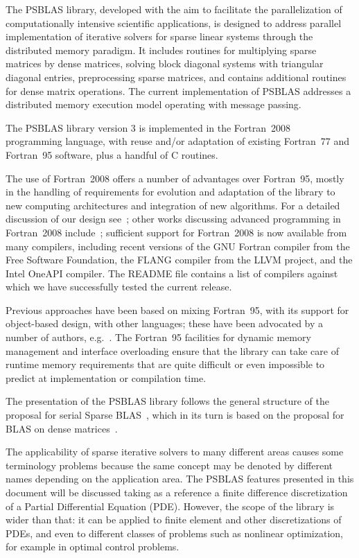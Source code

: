 The PSBLAS library, developed with the aim to facilitate the
parallelization of computationally intensive scientific applications,
is designed to address parallel implementation of iterative solvers
for sparse linear systems through the distributed memory paradigm.  It
includes routines for multiplying sparse matrices by dense matrices,
solving block diagonal systems with triangular diagonal entries,
preprocessing sparse matrices, and contains additional routines for
dense matrix operations.  The current implementation of PSBLAS
addresses a distributed memory execution model operating with message
passing. 

The PSBLAS library version 3 is  implemented in
 the Fortran~2008~\cite{metcalf} programming language, with reuse and/or
 adaptation of  existing Fortran~77 and Fortran~95 software, plus a
 handful of C  routines. 

The use of Fortran~2008 offers a number of advantages over Fortran~95,
mostly in the handling of requirements for evolution and adaptation of
the library to new computing architectures and integration of
new algorithms. 
For a detailed discussion of our design see~\cite{Sparse03}; other
works discussing advanced programming in Fortran~2008
include~\cite{DesPat:11,RouXiaXu:11}; sufficient support for
Fortran~2008 is now available from many compilers, including recent
versions of the GNU Fortran compiler from the Free Software
Foundation, the FLANG compiler from the LLVM project, and the Intel
OneAPI compiler.
The README file contains a list of compilers against which we have
successfully tested the current release. 


Previous approaches have been based on mixing Fortran~95, with its
support for object-based design, with other languages; these have
been advocated by a number of authors, 
e.g.~\cite{machiels}.  The Fortran~95 facilities for dynamic
memory management and interface overloading ensure that the library
can take care of runtime memory requirements that are quite difficult
or even impossible to predict at implementation or compilation time.  

The presentation of the
PSBLAS library follows the general structure of the proposal for
serial Sparse BLAS~\cite{sblas97,sblas02}, which in its turn is based on the
proposal for BLAS on dense matrices~\cite{BLAS1,BLAS2,BLAS3}.

The applicability of sparse iterative solvers to many different areas
causes some terminology problems because the same concept may be
denoted by different names depending on the application area. The
PSBLAS features presented in this document will be discussed taking as
a reference a finite difference discretization of a Partial
Differential Equation (PDE). However, the scope of the library is
wider than that: it can be applied to finite element and other 
discretizations of PDEs, and even to different classes of problems
such as nonlinear optimization, for example in optimal control problems.

